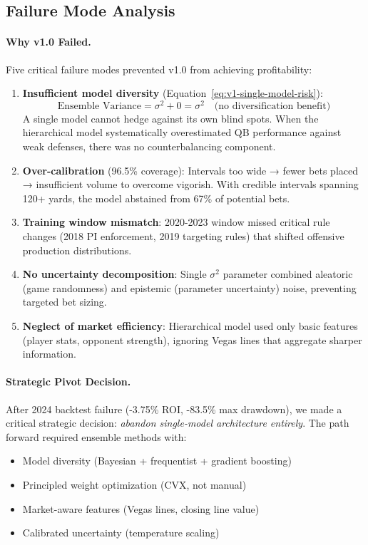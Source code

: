 \subsection{Failure Mode Analysis}

\paragraph{Why v1.0 Failed.}
Five critical failure modes prevented v1.0 from achieving profitability:

\begin{enumerate}
\item \textbf{Insufficient model diversity} (Equation~\ref{eq:v1-single-model-risk}):
\begin{equation}
\label{eq:v1-single-model-risk}
\text{Ensemble Variance} = \sigma^2 + 0 = \sigma^2 \quad \text{(no diversification benefit)}
\end{equation}
A single model cannot hedge against its own blind spots. When the hierarchical model systematically overestimated QB performance against weak defenses, there was no counterbalancing component.

\item \textbf{Over-calibration} (96.5\% coverage):
Intervals too wide → fewer bets placed → insufficient volume to overcome vigorish. With credible intervals spanning 120+ yards, the model abstained from 67\% of potential bets.

\item \textbf{Training window mismatch}:
2020-2023 window missed critical rule changes (2018 PI enforcement, 2019 targeting rules) that shifted offensive production distributions.

\item \textbf{No uncertainty decomposition}:
Single $\sigma^2$ parameter combined aleatoric (game randomness) and epistemic (parameter uncertainty) noise, preventing targeted bet sizing.

\item \textbf{Neglect of market efficiency}:
Hierarchical model used only basic features (player stats, opponent strength), ignoring Vegas lines that aggregate sharper information.
\end{enumerate}

\paragraph{Strategic Pivot Decision.}
After 2024 backtest failure (-3.75\% ROI, -83.5\% max drawdown), we made a critical strategic decision: \textit{abandon single-model architecture entirely}. The path forward required ensemble methods with:
\begin{itemize}[itemsep=2pt,parsep=0pt]
    \item Model diversity (Bayesian + frequentist + gradient boosting)
    \item Principled weight optimization (CVX, not manual)
    \item Market-aware features (Vegas lines, closing line value)
    \item Calibrated uncertainty (temperature scaling)
\end{itemize}

